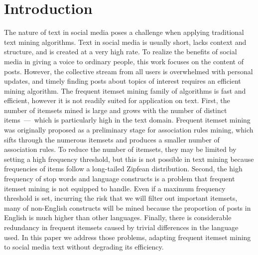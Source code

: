 \documentclass{sig-alternate}
\begin{document}

\newpage
\section{Introduction}

The nature of text in social media poses a challenge when applying
traditional text mining algorithms.
Text in social media is usually short, lacks context and structure,
and is created at a very high rate.
To realize the benefits of social media in giving a voice to ordinary people,
this work focuses on the content of posts.
However, the collective stream from all users is overwhelmed with personal
updates, and timely finding posts about topics of interest requires an
efficient mining algorithm.
The frequent itemset mining family of algorithms is fast and efficient,
however it is not readily suited for application on text.
First, the number of itemsets mined is large and grows with the number of
distinct items~---~which is particularly high in the text domain.
Frequent itemset mining was originally proposed as a preliminary stage for
association rules mining, which sifts through the numerous itemsets and
produces a smaller number of association rules.
To reduce the number of itemsets, they may be limited by setting a high
frequency threshold, but this is not possible in text mining because
frequencies of items follow a long-tailed Zipfean distribution.
Second, the high frequency of stop words and language constructs is a problem
that frequent itemset mining is not equipped to handle.
Even if a maximum frequency threshold is set, incurring the risk that we
will filter out important itemsets, many of non-English constructs will be
mined because the proportion of posts in English is much higher than
other languages.  Finally, there is considerable redundancy in frequent
itemsets caused by trivial differences in the language used.
In this paper we address those problems, adapting frequent itemset mining to
social media text without degrading its efficiency.
\end{document}
